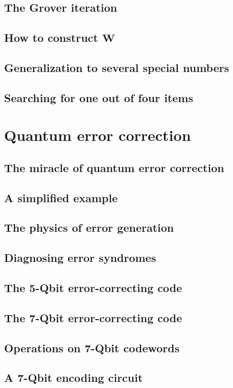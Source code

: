 \documentclass{book}
\theoremstyle{definition}
\begin{document}
\subsection{The Grover iteration}
\subsection{How to construct $\mathbf{W}$}
\subsection{Generalization to several special numbers}
\subsection{Searching for one out of four items}


\newpage

\section{Quantum error correction}

\subsection{The miracle of quantum error correction}
\subsection{A simplified example}
\subsection{The physics of error generation}
\subsection{Diagnosing error syndromes}
\subsection{The 5-Qbit error-correcting code}
\subsection{The 7-Qbit error-correcting code}
\subsection{Operations on 7-Qbit codewords}
\subsection{A 7-Qbit encoding circuit}
\end{document}
